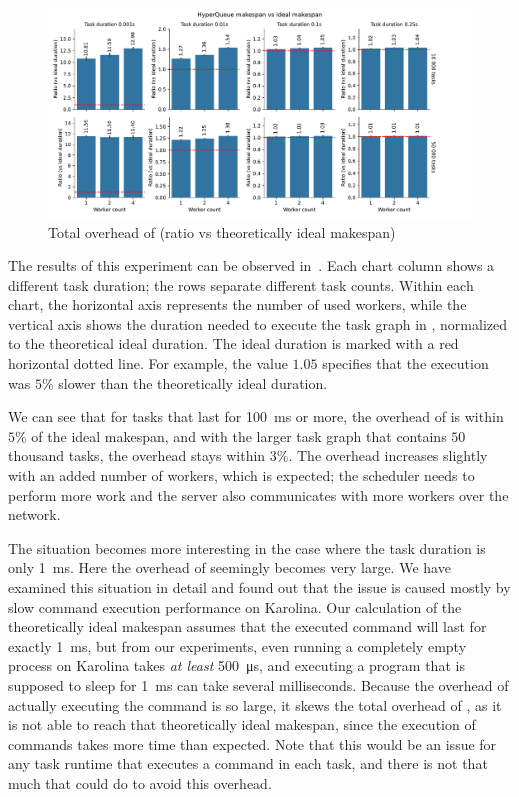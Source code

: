 \begin{figure}[h]
	\centering
	\includegraphics[width=\textwidth]{imgs/hq/charts/total-overhead-vs-ideal}
	\caption{Total overhead of \hyperqueue{} (ratio vs theoretically ideal makespan)}
	\label{fig:hq-overhead-vs-ideal}
\end{figure}

The results of this experiment can be observed in~. Each chart column shows
a different task duration; the rows separate different task counts. Within each chart, the
horizontal axis represents the number of used workers, while the vertical axis shows the duration
needed to execute the task graph in \hyperqueue{}, normalized to the theoretical ideal
duration. The ideal duration is marked with a red horizontal dotted line. For example, the value
$1.05$ specifies that the \hyperqueue{} execution was
$5\%$ slower than the theoretically ideal duration.

We can see that for tasks that last for \SI{100}{\milli\second} or more, the overhead of
\hyperqueue{} is within $5\%$ of the ideal makespan, and with the larger
task graph that contains $50$ thousand tasks, the overhead stays within
$3\%$. The overhead increases slightly with an added number of workers, which is
expected; the scheduler needs to perform more work and the server also communicates with more
workers over the network.

The situation becomes more interesting in the case where the task duration is only
\SI{1}{\milli\second}. Here the overhead of \hyperqueue{} seemingly becomes very large.
We have examined this situation in detail and found out that the issue is caused mostly by slow
command execution performance on Karolina. Our calculation of the theoretically ideal makespan
assumes that the executed command will last for exactly \SI{1}{\milli\second}, but from our
experiments, even running a completely empty process on Karolina takes \emph{at least}
\SI{500}{\micro\second}, and executing a program that is supposed to sleep for
\SI{1}{\milli\second} can take several milliseconds. Because the overhead of actually executing
the command is so large, it skews the total overhead of \hyperqueue{}, as it is not able
to reach that theoretically ideal makespan, since the execution of commands takes more time than
expected. Note that this would be an issue for any task runtime that executes a command in each
task, and there is not that much that \hyperqueue{} could do to avoid this overhead.

